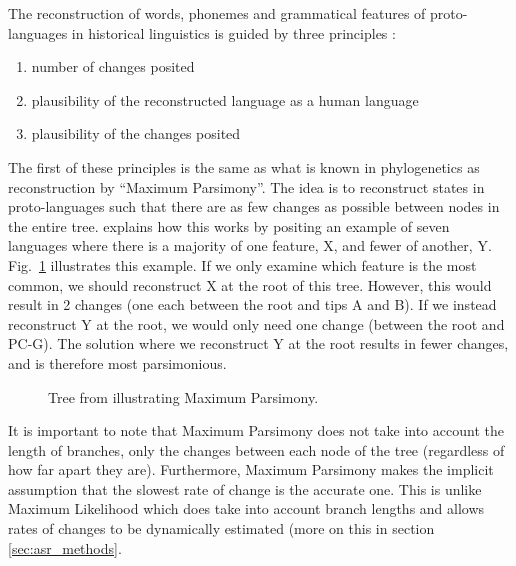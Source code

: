 \documentclass[a4paper,10pt]{article} %
\begin{document}
The reconstruction of words, phonemes and grammatical features of proto-languages in historical linguistics is guided by three principles \citep[17-22]{clark1976aspects}:

\begin{enumerate}[label=(\roman*)]
\item number of changes posited
\item plausibility of the reconstructed language as a human language
\item plausibility of the changes posited
\end{enumerate}

The first of these principles is the same as what is known in phylogenetics as reconstruction by ``Maximum Parsimony''. The idea is to reconstruct states in proto-languages such that there are as few changes as possible between nodes in the entire tree. \citet[17-22]{clark1976aspects} explains how this works by positing an example of seven languages where there is a majority of one feature, X, and fewer of another, Y. Fig.~\ref{fig:clark_tree} illustrates this example. If we only examine which feature is the most common, we should reconstruct X at the root of this tree. However, this would result in 2 changes (one each between the root and tips A and B). If we instead reconstruct Y at the root, we would only need one change (between the root and PC-G). The solution where we reconstruct Y at the root results in fewer changes, and is therefore most parsimonious.
 
\begin{figure}[h]
\centering
\caption{{Tree from \citet[19]{clark1976aspects} illustrating Maximum Parsimony.}}
\label{fig:clark_tree}
\end{figure}

It is important to note that Maximum Parsimony does not take into account the length of branches, only the changes between each node of the tree (regardless of how far apart they are). Furthermore, Maximum Parsimony makes the implicit assumption that the slowest rate of change is the accurate one. This is unlike Maximum Likelihood which does take into account branch lengths and allows rates of changes to be dynamically estimated (more on this in section \ref{sec:asr_methods}.

\end{document}
